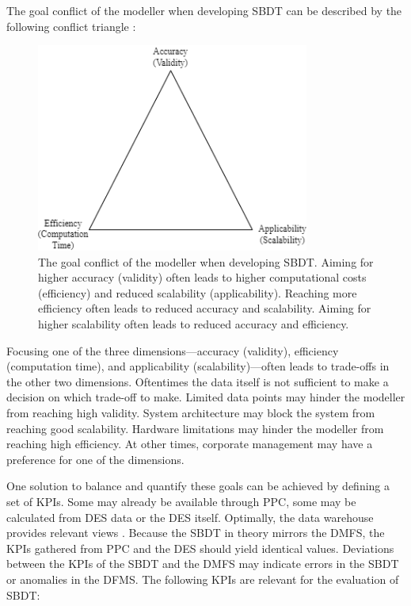 The goal conflict of the modeller when developing SBDT can be described by the following conflict triangle \parencite{robinson2014simulation,balci2012life}:

\begin{figure}[htbp]
  \centering
  \includegraphics[width=0.8\textwidth]{figures/goals.png}
  \caption{The goal conflict of the modeller when developing SBDT. Aiming for higher accuracy (validity) often leads to higher computational costs (efficiency) and reduced scalability (applicability). Reaching more efficiency often leads to reduced accuracy and scalability. Aiming for higher scalability often leads to reduced accuracy and efficiency.}
  \label{fig:goals}
\end{figure}

Focusing one of the three dimensions—accuracy (validity), efficiency (computation time), and applicability (scalability)—often leads to trade-offs in the other two dimensions. Oftentimes the data itself is not sufficient to make a decision on which trade-off to make. Limited data points may hinder the modeller from reaching high validity. System architecture may block the system from reaching good scalability. Hardware limitations may hinder the modeller from reaching high efficiency.
At other times, corporate management may have a preference for one of the dimensions.

One solution to balance and quantify these goals can be achieved by defining a set of KPIs. Some may already be available through PPC, some may be calculated from DES data or the DES itself. Optimally, the data warehouse provides relevant views \parencite{cui2020manufacturing}. Because the SBDT in theory mirrors the DMFS, the KPIs gathered from PPC and the DES should yield identical values. Deviations between the KPIs of the SBDT and the DMFS may indicate errors in the SBDT or anomalies in the DFMS. The following KPIs are relevant for the evaluation of SBDT:

